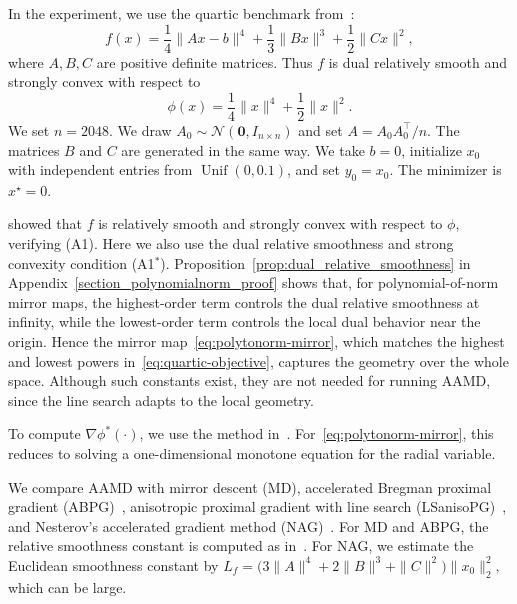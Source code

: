 \documentclass{article}
\theoremstyle{plain}
\theoremstyle{definition}
\theoremstyle{remark}
\begin{document}
In the experiment, we use the quartic benchmark from~\cite{lu2018relatively}:
\begin{equation}\label{eq:quartic-objective}
f(x)=\frac14\|Ax-b\|^4+\frac13\|Bx\|^3+\frac12\|Cx\|^2,
\end{equation}
where $A,B,C$ are positive definite matrices. 
Thus $f$ is dual relatively smooth and strongly convex with respect to
\begin{equation}\label{eq:polytonorm-mirror}
\phi(x)=\frac14\|x\|^4+\frac12\|x\|^2.
\end{equation}
We set $n=2048$. We draw $A_0\sim\mathcal N(\mathbf 0,I_{n\times n})$ and set $A=A_0A_0^\top/n$. The matrices $B$ and $C$ are generated in the same way. We take $b=0$, initialize $x_0$ with independent entries from $\operatorname{Unif}(0,0.1)$, and set $y_0=x_0$. The minimizer is $x^\star=0$.

\citet{lu2018relatively} showed that $f$ is relatively smooth and strongly convex with respect to $\phi$, verifying (A1). Here we also use the dual relative smoothness and strong convexity condition (A1$^*$). Proposition~\ref{prop:dual_relative_smoothness} in Appendix~\ref{section_polynomialnorm_proof} shows that, for polynomial-of-norm mirror maps, the highest-order term controls the dual relative smoothness at infinity, while the lowest-order term controls the local dual behavior near the origin. Hence the mirror map~\eqref{eq:polytonorm-mirror}, which matches the highest and lowest powers in~\eqref{eq:quartic-objective}, captures the geometry over the whole space. Although such constants exist, they are not needed for running AAMD, since the line search adapts to the local geometry.

To compute $\nabla\phi^*(\cdot)$, we use the method in~\cite{lu2018relatively}. For~\eqref{eq:polytonorm-mirror}, this reduces to solving a one-dimensional monotone equation for the radial variable.

We compare AAMD with mirror descent (MD), accelerated Bregman proximal gradient (ABPG)~\cite{hanzely_accelerated_2018}, anisotropic proximal gradient with line search (LSanisoPG)~\cite{laude2025anisotropic}, and Nesterov's accelerated gradient method (NAG)~\cite{nesterov1983method}. For MD and ABPG, the relative smoothness constant is computed as in~\cite{lu2018relatively}. For NAG, we estimate the Euclidean smoothness constant by
$\displaystyle
L_f=\bigl(3\|A\|^4+2\|B\|^3+\|C\|^2\bigr)\|x_0\|_2^2,
$
which can be large.
\end{document}
